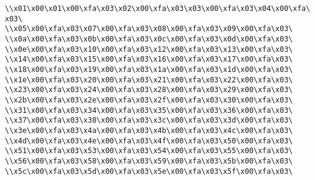 \verb|\\x01\x00\x01\x00\xfa\x03\x02\x00\xfa\x03\x03\x00\xfa\x03\x04\x00\xfa\x03\|\newline
\verb|\\x05\x00\xfa\x03\x07\x00\xfa\x03\x08\x00\xfa\x03\x09\x00\xfa\x03\|\newline
\verb|\\x0a\x00\xfa\x03\x0b\x00\xfa\x03\x0c\x00\xfa\x03\x0d\x00\xfa\x03\|\newline
\verb|\\x0e\x00\xfa\x03\x10\x00\xfa\x03\x12\x00\xfa\x03\x13\x00\xfa\x03\|\newline
\verb|\\x14\x00\xfa\x03\x15\x00\xfa\x03\x16\x00\xfa\x03\x17\x00\xfa\x03\|\newline
\verb|\\x18\x00\xfa\x03\x19\x00\xfa\x03\x1a\x00\xfa\x03\x1d\x00\xfa\x03\|\newline
\verb|\\x1e\x00\xfa\x03\x20\x00\xfa\x03\x21\x00\xfa\x03\x22\x00\xfa\x03\|\newline
\verb|\\x23\x00\xfa\x03\x24\x00\xfa\x03\x28\x00\xfa\x03\x29\x00\xfa\x03\|\newline
\verb|\\x2b\x00\xfa\x03\x2e\x00\xfa\x03\x2f\x00\xfa\x03\x30\x00\xfa\x03\|\newline
\verb|\\x31\x00\xfa\x03\x34\x00\xfa\x03\x35\x00\xfa\x03\x36\x00\xfa\x03\|\newline
\verb|\\x37\x00\xfa\x03\x38\x00\xfa\x03\x3c\x00\xfa\x03\x3d\x00\xfa\x03\|\newline
\verb|\\x3e\x00\xfa\x03\x4a\x00\xfa\x03\x4b\x00\xfa\x03\x4c\x00\xfa\x03\|\newline
\verb|\\x4d\x00\xfa\x03\x4e\x00\xfa\x03\x4f\x00\xfa\x03\x50\x00\xfa\x03\|\newline
\verb|\\x51\x00\xfa\x03\x53\x00\xfa\x03\x54\x00\xfa\x03\x55\x00\xfa\x03\|\newline
\verb|\\x56\x00\xfa\x03\x58\x00\xfa\x03\x59\x00\xfa\x03\x5b\x00\xfa\x03\|\newline
\verb|\\x5c\x00\xfa\x03\x5d\x00\xfa\x03\x5e\x00\xfa\x03\x5f\x00\xfa\x03\|\newline
